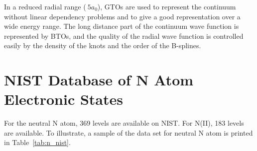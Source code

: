 In a reduced radial range ($~5 a_0$),
GTOs are used to represent the continuum without linear
dependency problems and to give a good representation over
a wide energy range. The long distance part of the continuum
wave function is represented by BTOs, and the quality of the radial
wave function is controlled easily by the density of the knots
and the order of the B-splines. 

\section{NIST Database of N Atom Electronic States}

For the neutral N atom, 369 levels are available on NIST.\cite{NIST_ASD}
For N(II), 183 levels are available. 
To illustrate, a sample of the data set for neutral N atom is printed in Table~\ref{tab:n_nist}.

